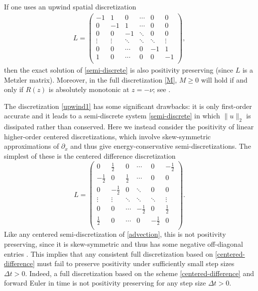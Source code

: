 \documentclass[smallextended,numbook,runningheads]{svjour3}     %
\newcommand{\dt}{\Delta t}
\begin{document}
If one uses an upwind spatial discretization
\begin{align}\label{upwind1}
L=\left(
\begin{array}{cccccc}
 -1 & 1 & 0  & \cdots & 0 & 0 \\
 0 & -1 & 1 &  \cdots & 0 & 0 \\
 0 & 0 & -1 &  \ddots & 0 & 0\\
 \vdots  & \vdots  & \ddots  & \ddots & \ddots & \vdots \\
  0 & 0 & \cdots  & 0 & -1 & 1 \\
 1 & 0 & \cdots & 0 & 0 & -1 \\
\end{array}
\right),
\end{align}
then the exact solution of \eqref{semi-discrete} is also positivity
preserving (since $L$ is a Metzler matrix). Moreover, in the full discretization
\eqref{M}, $M\ge0$ will hold if and only if $R(z)$ is absolutely monotonic at $z=-\nu$;
see \cite{kraaijevanger1991,SSPbook}.

The discretization \eqref{upwind1} has some significant drawbacks: it is only first-order
accurate and it leads to a semi-discrete system \eqref{semi-discrete} in which $\|u\|_2$
is dissipated rather than conserved.
Here we instead consider the positivity of linear higher-order centered discretizations,
which involve skew-symmetric approximations of $\partial_x$ and thus give
energy-conservative semi-discretizations.
The simplest of these is the centered difference discretization
\begin{equation}\label{centered-difference}
L=\left(
\begin{array}{cccccc}
 0 & \frac{1}{2} & 0  & \cdots & 0 & -\frac{1}{2} \\
 -\frac{1}{2} & 0 & \frac{1}{2} &  \cdots & 0 & 0 \\
 0 & -\frac{1}{2} & 0 &  \ddots & 0 & 0\\
 \vdots  & \vdots  & \ddots  & \ddots & \ddots & \vdots \\
  0 & 0 & \cdots  & -\frac{1}{2} & 0 & \frac{1}{2} \\
 \frac{1}{2} & 0 & \cdots & 0 & -\frac{1}{2} & 0 \\
\end{array}
\right).
\end{equation}
Like any centered semi-discretization of \eqref{advection}, this is
not positivity preserving, since it is skew-symmetric and thus has
some negative off-diagonal entries \cite[Chapter I, Theorem 7.2]{hundsdorferverwer}.
This implies that any consistent full discretization based on \eqref{centered-difference}
must fail to preserve positivity under sufficiently small step sizes $\dt>0$.
Indeed, a full discretization based on the scheme \eqref{centered-difference}
and forward Euler in time is not positivity preserving for any step size $\dt>0$.
\end{document}

